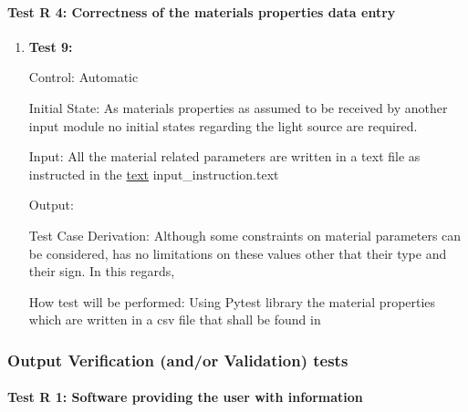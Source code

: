 \documentclass[12pt, titlepage]{article}
\begin{document}
\paragraph{Test R 4: Correctness of the materials properties data entry}
\begin{enumerate}
\item{\textbf{Test 9:} \\}

Control: Automatic

Initial State: As materials properties as assumed to be received by another input module no initial states regarding the light source are required.

Input: All the material related parameters are written in a text file as instructed in the \href{URL}{text} input_instruction.text

Output: 

Test Case Derivation: Although some constraints on material parameters can be considered, \progname{} has no limitations on these values other that their type and their sign. In this regards,   

How test will be performed: Using Pytest library the material properties which are written in a csv file that shall be found in 

 
\end{enumerate}


\subsubsection{Output Verification (and/or Validation) tests}
\paragraph{Test R 1: Software providing the user with information }
\end{document}
